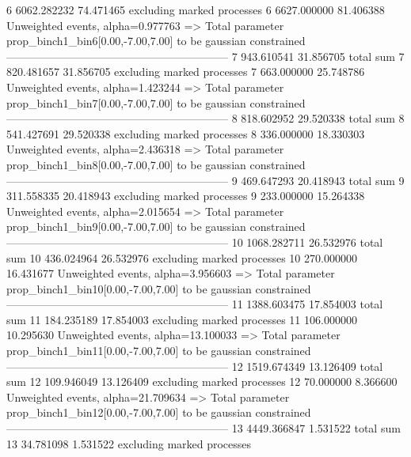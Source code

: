 6          6062.282232     74.471465       excluding marked processes    
6          6627.000000     81.406388       Unweighted events, alpha=0.977763
  => Total parameter prop_binch1_bin6[0.00,-7.00,7.00] to be gaussian constrained
------------------------------------------------------------
7          943.610541      31.856705       total sum                     
7          820.481657      31.856705       excluding marked processes    
7          663.000000      25.748786       Unweighted events, alpha=1.423244
  => Total parameter prop_binch1_bin7[0.00,-7.00,7.00] to be gaussian constrained
------------------------------------------------------------
8          818.602952      29.520338       total sum                     
8          541.427691      29.520338       excluding marked processes    
8          336.000000      18.330303       Unweighted events, alpha=2.436318
  => Total parameter prop_binch1_bin8[0.00,-7.00,7.00] to be gaussian constrained
------------------------------------------------------------
9          469.647293      20.418943       total sum                     
9          311.558335      20.418943       excluding marked processes    
9          233.000000      15.264338       Unweighted events, alpha=2.015654
  => Total parameter prop_binch1_bin9[0.00,-7.00,7.00] to be gaussian constrained
------------------------------------------------------------
10         1068.282711     26.532976       total sum                     
10         436.024964      26.532976       excluding marked processes    
10         270.000000      16.431677       Unweighted events, alpha=3.956603
  => Total parameter prop_binch1_bin10[0.00,-7.00,7.00] to be gaussian constrained
------------------------------------------------------------
11         1388.603475     17.854003       total sum                     
11         184.235189      17.854003       excluding marked processes    
11         106.000000      10.295630       Unweighted events, alpha=13.100033
  => Total parameter prop_binch1_bin11[0.00,-7.00,7.00] to be gaussian constrained
------------------------------------------------------------
12         1519.674349     13.126409       total sum                     
12         109.946049      13.126409       excluding marked processes    
12         70.000000       8.366600        Unweighted events, alpha=21.709634
  => Total parameter prop_binch1_bin12[0.00,-7.00,7.00] to be gaussian constrained
------------------------------------------------------------
13         4449.366847     1.531522        total sum                     
13         34.781098       1.531522        excluding marked processes    
